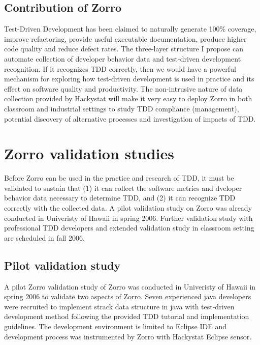 \subsection{Contribution of Zorro}
Test-Driven Development has been claimed to naturally generate 100\%
coverage, improve refactoring, provide useful executable documentation,
produce higher code quality and reduce defect
rates\cite{Beck:03,George:03,Maximilien:03}. The three-layer structure I
propose can automate collection of developer behavior data and test-driven
development recognition. If it recognizes TDD correctly, then we would have
a powerful mechanism for exploring how test-driven development is used in
practice and its effect on software quality and productivity. The
non-intrusive nature of data collection provided by Hackystat will make it
very easy to deploy Zorro in both classroom and industrial settings to
study TDD compliance (management), potential discovery of alternative
processes and investigation of impacts of TDD.

\section{Zorro validation studies}
Before Zorro can be used in the practice and research of TDD, it must be
validated to sustain that (1) it can collect the software metrics and
dveloper behavior data necessary to determine TDD, and (2) it can recognize
TDD correctly with the collected data. A pilot validation study on Zorro
was already conducted in Univeristy of Hawaii in spring 2006. Further
validation study with professional TDD developers and extended validation
study in classroom setting are scheduled in fall 2006.

\subsection{Pilot validation study}
A pilot Zorro validation study of Zorro was conducted in Univeristy of
Hawaii in spring 2006 to validate two aspects of Zorro. Seven experienced
java developers were recruited to implement strack data structure in java
with test-driven development method following the provided TDD tutorial and
implementation guidelines. The development environment is limited to
Eclipse IDE and development process was instrumented by Zorro with
Hackystat Eclipse sensor.


